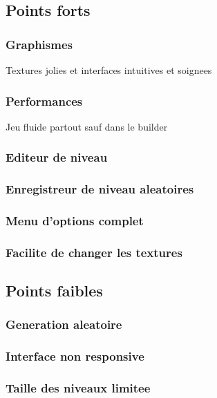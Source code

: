 \documentclass[../main.tex]{subfiles}
\begin{document}
\subsection{Points forts}
\subsubsection{Graphismes}
Textures jolies et interfaces intuitives et soignees
\subsubsection{Performances}
Jeu fluide partout sauf dans le builder
\subsubsection{Editeur de niveau}
\subsubsection{Enregistreur de niveau aleatoires}
\subsubsection{Menu d'options complet}
\subsubsection{Facilite de changer les textures}

\subsection{Points faibles}
\subsubsection{Generation aleatoire}
\subsubsection{Interface non responsive}
\subsubsection{Taille des niveaux limitee}
\end{document}
